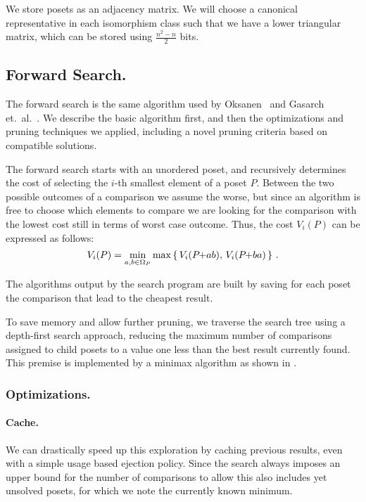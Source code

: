 \documentclass[twoside,leqno,twocolumn]{article}
\newcommand{\pchild}[3]{{#1}\kern-1pt{+}{#2}{#3}}
\begin{document}
We store posets as an adjacency matrix.
We will choose a canonical representative in each isomorphism class such that we have a lower triangular matrix, which can be stored using $\frac{n^2 - n}{2}$ bits.


\subsection{Forward Search.} \label{chapter:forward_search}
The forward search is the same algorithm used by Oksanen~\cite{Oksanen2006} and Gasarch et.\ al\@.~\cite{Gasarch1996}.
We describe the basic algorithm first, and then the optimizations and pruning techniques we applied, including a novel pruning criteria based on compatible solutions.

The forward search starts with an unordered poset, and recursively determines the cost of selecting the $i$-th smallest element of a poset $P$.
Between the two possible outcomes of a comparison we assume the worse, but since an algorithm is free to choose which elements to compare we are looking for the comparison with the lowest cost still in terms of worst case outcome.
Thus, the cost $V_i(P)$ can be expressed as follows:
\begin{equation}
  V_i(P) = \min_{a,b \in \Omega_P} \max \left\{ \,V_i(\pchild{P}{a}{b}),\, V_i(\pchild{P}{b}{a})\,\right\}\,\text{.}
\end{equation}

The algorithms output by the search program are built by saving for each poset the comparison that lead to the cheapest result.

To save memory and allow further pruning, we traverse the search tree using a depth-first search approach, reducing the maximum number of comparisons assigned to child posets to a value one less than the best result currently found.
This premise is implemented by a minimax algorithm as shown in .



\subsubsection{Optimizations.}

\paragraph{Cache.}
We can drastically speed up this exploration by caching previous results, even with a simple usage based ejection policy.
Since the search always imposes an upper bound for the number of comparisons to allow this also includes yet unsolved posets, for which we note the currently known minimum.
\end{document}

